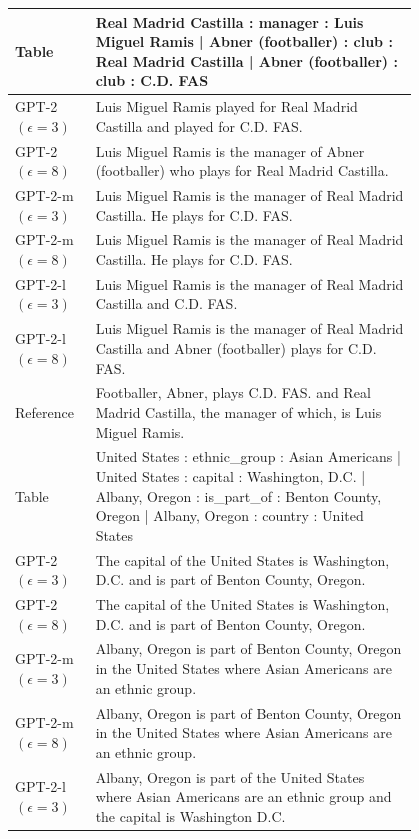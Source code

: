 \begin{table}[h]
\centering
\renewcommand{\arraystretch}{1.2}
\scriptsize
\begin{tabular}{l | p{0.8\linewidth}}
\toprule
Table & Real Madrid Castilla : manager : Luis Miguel Ramis | Abner (footballer) : club : Real Madrid Castilla | Abner (footballer) : club : C.D. FAS  \\
 \hline
GPT-2 $(\epsilon=3)$ & Luis Miguel Ramis played for Real Madrid Castilla and played for C.D. FAS. \\
GPT-2 $(\epsilon=8)$ & Luis Miguel Ramis is the manager of Abner (footballer) who plays for Real Madrid Castilla. \\
GPT-2-m $(\epsilon=3)$ & Luis Miguel Ramis is the manager of Real Madrid Castilla. He plays for C.D. FAS. \\
GPT-2-m $(\epsilon=8)$ & Luis Miguel Ramis is the manager of Real Madrid Castilla. He plays for C.D. FAS. \\
GPT-2-l $(\epsilon=3)$ & Luis Miguel Ramis is the manager of Real Madrid Castilla and C.D. FAS. \\
GPT-2-l $(\epsilon=8)$ & Luis Miguel Ramis is the manager of Real Madrid Castilla and Abner (footballer) plays for C.D. FAS. \\
\hline
 Reference & Footballer, Abner, plays C.D. FAS. and Real Madrid Castilla, the manager of which, is Luis Miguel Ramis. \\
\midrule\midrule
Table & United States : ethnic\_group : Asian Americans | United States : capital : Washington, D.C. | Albany, Oregon : is\_part\_of : Benton County, Oregon | Albany, Oregon : country : United States  \\
 \hline
GPT-2 $(\epsilon=3)$ & The capital of the United States is Washington, D.C. and is part of Benton County, Oregon. \\
GPT-2 $(\epsilon=8)$ & The capital of the United States is Washington, D.C. and is part of Benton County, Oregon. \\
GPT-2-m $(\epsilon=3)$ & Albany, Oregon is part of Benton County, Oregon in the United States where Asian Americans are an ethnic group. \\
GPT-2-m $(\epsilon=8)$ & Albany, Oregon is part of Benton County, Oregon in the United States where Asian Americans are an ethnic group. \\
GPT-2-l $(\epsilon=3)$ & Albany, Oregon is part of the United States where Asian Americans are an ethnic group and the capital is Washington D.C. \\

\end{tabular}
\end{table}
